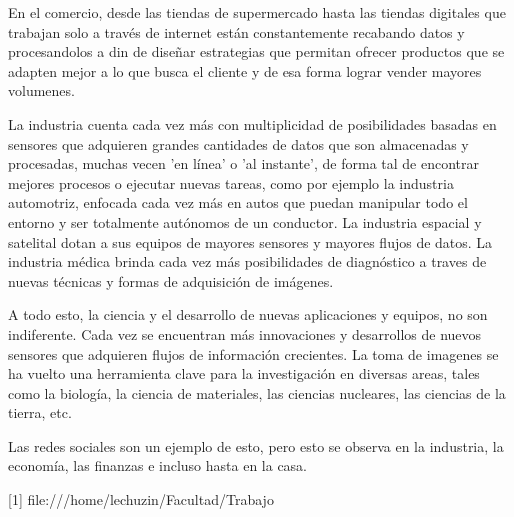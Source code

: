 En el comercio, desde las tiendas de supermercado hasta las tiendas digitales que trabajan solo a través de internet están constantemente recabando datos y procesandolos a din de diseñar estrategias que permitan ofrecer productos que se adapten mejor a lo que busca el cliente y de esa forma lograr vender mayores volumenes.

La industria cuenta cada vez más con multiplicidad de posibilidades basadas en sensores que adquieren grandes cantidades de datos que son almacenadas y procesadas, muchas vecen 'en línea' o 'al instante', de forma tal de encontrar mejores procesos o ejecutar nuevas tareas, como por ejemplo la industria automotriz, enfocada cada vez más en autos que puedan manipular todo el entorno y ser totalmente autónomos de un conductor.
La industria espacial y satelital dotan a sus equipos de mayores sensores y mayores flujos de datos. La industria médica brinda cada vez más posibilidades de diagnóstico a traves de nuevas técnicas y formas de adquisición de imágenes.

A todo esto, la ciencia y el desarrollo de nuevas aplicaciones y equipos, no son indiferente. Cada vez se encuentran más innovaciones y desarrollos de nuevos sensores que adquieren flujos de información crecientes. La toma de imagenes se ha vuelto una herramienta clave para la investigación en diversas areas, tales como la biología, la ciencia de materiales, las ciencias nucleares, las ciencias de la tierra, etc.

Las redes sociales son un ejemplo de esto, pero esto se observa en la industria, la economía, las finanzas e incluso hasta en la casa.



[1] file:///home/lechuzin/Facultad/Trabajo%